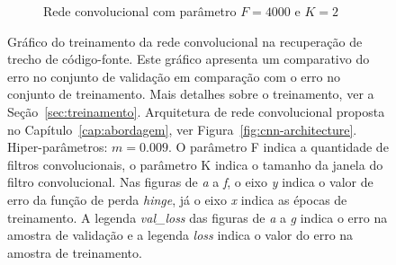 \begin{figure}[H]
\begin{subfigure}{.5\textwidth}
  \caption{Rede convolucional com parâmetro $F = 4000$ e $K = 2$}
  \label{fig:cnn-4000-k-2-v2}
\end{subfigure}
\caption{Gráfico do treinamento da rede convolucional na recuperação de trecho de código-fonte. Este gráfico apresenta um comparativo do erro no conjunto de validação em comparação com o erro no conjunto de treinamento. Mais detalhes sobre o treinamento, ver a Seção~\ref{sec:treinamento}. Arquitetura de rede convolucional proposta no Capítulo~\ref{cap:abordagem}, ver Figura~\ref{fig:cnn-architecture}. Hiper-parâmetros: $m = 0.009$. O parâmetro F indica a quantidade de filtros convolucionais, o parâmetro K indica o tamanho da janela do filtro convolucional. Nas figuras de \emph{a} a \emph{f}, o eixo \emph{y} indica o valor de erro da função de perda \textit{hinge}, já o eixo \emph{x} indica as épocas de treinamento. A legenda \emph{val\_loss} das figuras de \emph{a} a \emph{g} indica o erro na amostra de validação e a legenda \emph{loss} indica o valor do erro na amostra de treinamento. }
\label{fig:treinamento-cnn-diferentes-kernels}
\end{figure}

